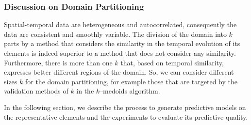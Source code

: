 \subsubsection{Discussion on Domain Partitioning}
\label{Sec:DomainPartitioningDiscussion}

Spatial-temporal data are heterogeneous and autocorrelated, consequently the data are consistent and smoothly variable. The division of the domain into $k$ parts by a method that considers the similarity in the temporal evolution of its elements is indeed superior to a method that does not consider any similarity. Furthermore, there is more than one $k$ that, based on temporal similarity, expresses better different regions of the domain. So, we can consider different sizes $k$ for the domain partitioning, for example those that are targeted by the validation methods of $k$ in the $k$--medoids algorithm. 



In the following section, we describe the process to generate predictive models on the representative elements and the experiments to evaluate its predictive quality.

